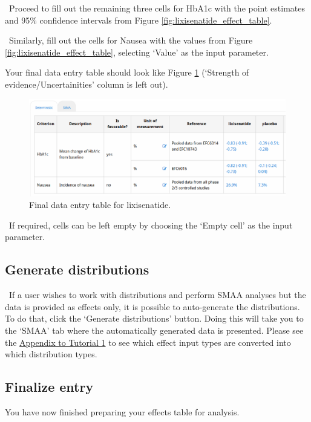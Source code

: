 \documentclass[00_mcda_tutorial.tex]{subfiles}
\begin{document}
\noindent \leftpointright \, Proceed to fill out the remaining three cells for HbA1c with the point estimates and 95\% confidence intervals from Figure \ref{fig:lixisenatide_effect_table}.
\newline

\noindent \leftpointright \, Similarly, fill out the cells for Nausea with the values from Figure \ref{fig:lixisenatide_effect_table}, selecting ‘Value’ as the input parameter.
\newline

Your final data entry table should look like Figure \ref{fig:dataFinished} (‘Strength of evidence/Uncertainities’ column is left out).

\begin{figure}[!h]
    \centering
	\includegraphics[width=\textwidth]{fig/effectsInputDone.png}
    \caption{Final data entry table for lixisenatide.}
	\label{fig:dataFinished}
\end{figure}

\noindent \faLightbulbO \, If required, cells can be left empty by choosing the ‘Empty cell’ as the input parameter.

\subsection*{Generate distributions}
\noindent \leftpointright \, If a user wishes to work with distributions and perform SMAA analyses but the data is provided as effects only, it is possible to auto-generate the distributions. To do that, click the ‘Generate distributions’ button. Doing this will take you to the ‘SMAA’ tab where the automatically generated data is presented. Please see the \hyperref[appendix1]{Appendix to Tutorial 1} to see which effect input types are converted into which distribution types.

\subsection*{Finalize entry}
You have now finished preparing your effects table for analysis.
\newline
\end{document}
